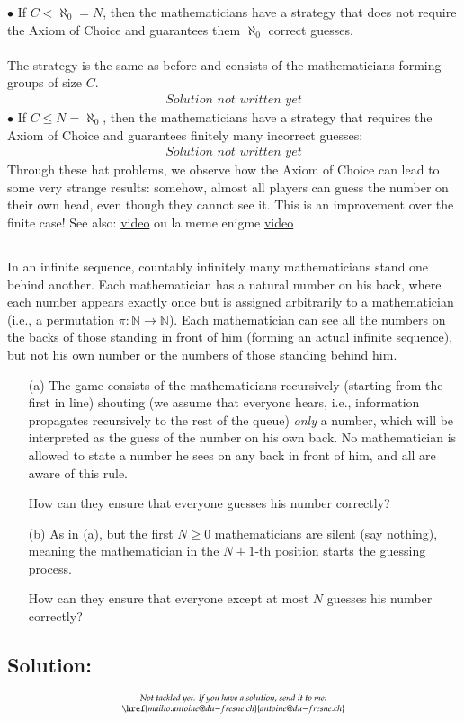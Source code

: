 \documentclass[11pt, a4paper, oneside]{article}
\newcommand{\solution}[1][]{\subsection*{#1}\hfill \par}
\theoremstyle{remark}
\theoremstyle{lemma}
\begin{document}
\(\bullet\) If \(C<\aleph_0=N\), then the mathematicians have a strategy that does not require the Axiom of Choice and guarantees them \(\aleph_0\) correct guesses.
\\\\
The strategy is the same as before and consists of the mathematicians forming groups of size \(C\).
\[
\substack{\textit{Solution not written yet}}
\]
\(\bullet\) If \(C\leq N=\aleph_0\), then the mathematicians have a strategy that requires the Axiom of Choice and guarantees finitely many incorrect guesses:
\[
\substack{\textit{Solution not written yet}}
\]
Through these hat problems, we observe how the Axiom of Choice can lead to some very strange results: somehow, almost all players can guess the number on their own head, even though they cannot see it. This is an improvement over the finite case!
See also: \href{https://www.youtube.com/watch?v=zY67sNAtZNc}{video} ou la meme enigme \href{https://www.youtube.com/watch?v=ydPJlWJviEw}{video}
\newpage
\subsection{}
In an infinite sequence, countably infinitely many mathematicians stand one behind another. Each mathematician has a natural number on his back, where each number appears exactly once but is assigned arbitrarily to a mathematician (i.e., a permutation \(\pi: \mathbb{N} \to \mathbb{N}\)). Each mathematician can see all the numbers on the backs of those standing in front of him (forming an actual infinite sequence), but not his own number or the numbers of those standing behind him.

\begin{enumerate}
    \item[(a)] The game consists of the mathematicians recursively (starting from the first in line) shouting (we assume that everyone hears, i.e., information propagates recursively to the rest of the queue) \textit{only} a number, which will be interpreted as the guess of the number on his own back. No mathematician is allowed to state a number he sees on any back in front of him, and all are aware of this rule.
    
    How can they ensure that everyone guesses his number correctly?

    \item[(b)] As in (a), but the first \(N \geq 0\) mathematicians are silent (say nothing), meaning the mathematician in the \(N+1\)-th position starts the guessing process.
    
    How can they ensure that everyone except at most \(N\) guesses his number correctly?
\end{enumerate}
\solution[Solution:]
\[
\substack{\textit{Not tackled yet. If you have a solution, send it to me:} \\ \href{mailto:antoine@du-fresne.ch}{antoine@du-fresne.ch}}
\]

\newpage
\printbibliography
\end{document}
